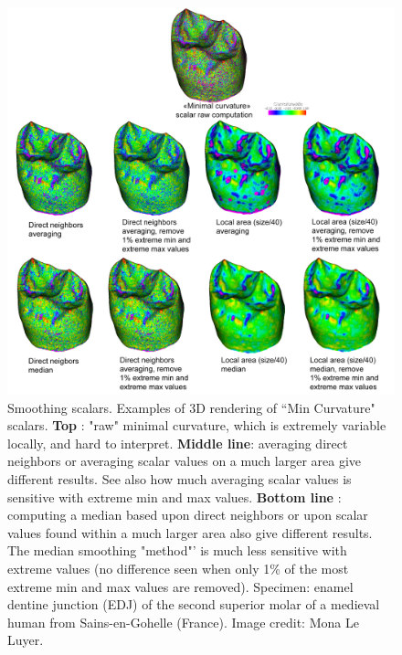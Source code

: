 \begin{figure}
  \centering
  \includegraphics[scale=0.2]{images/11/scalar_smoothing_example.png} 
	\caption{ 
Smoothing scalars. Examples of 3D rendering of ``Min Curvature" scalars. \textbf{Top} : "raw" minimal curvature, which is extremely variable locally, and hard to interpret.  \textbf{Middle line}: averaging direct neighbors  or averaging scalar values on a much larger area give different results. See also how much averaging scalar values is sensitive with extreme min and max values. \textbf{Bottom line} : computing a median based upon direct neighbors  or upon scalar values found within a much larger area also give different results. The median smoothing "method"' is much less sensitive with extreme values (no difference seen when only 1\% of the most extreme min and max values are removed).  Specimen: enamel dentine junction (EDJ) of the second superior molar of a medieval human from Sains-en-Gohelle (France). Image credit: Mona Le Luyer.	
	}
\label{smoothing_scalars_example}
\end{figure}



